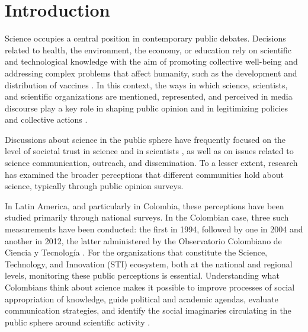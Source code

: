 \documentclass[pdflatex,sn-mathphys-num, iicol]{sn-jnl}
\begin{document}
	
	\maketitle
	
	\section{Introduction}\label{sec:intro}
	
	Science occupies a central position in contemporary public debates. Decisions related to health, the environment, the economy, or education rely on scientific and technological knowledge with the aim of promoting collective well-being and addressing complex problems that affect humanity, such as the development and distribution of vaccines \cite{Chakravartty2022}. In this context, the ways in which science, scientists, and scientific organizations are mentioned, represented, and perceived in media discourse play a key role in shaping public opinion and in legitimizing policies and collective actions \cite{Mede2022}.
	
	Discussions about science in the public sphere have frequently focused on the level of societal trust in science and in scientists \cite{Cologna2025, Sturgis2021, Mede2022}, as well as on issues related to science communication, outreach, and dissemination. To a lesser extent, research has examined the broader perceptions that different communities hold about science, typically through public opinion surveys.
	
	In Latin America, and particularly in Colombia, these perceptions have been studied primarily through national surveys. In the Colombian case, three such measurements have been conducted: the first in 1994, followed by one in 2004 and another in 2012, the latter administered by the Observatorio Colombiano de Ciencia y Tecnolog{\'i}a \cite{Daza_Caicedo2014}. For the organizations that constitute the Science, Technology, and Innovation (STI) ecosystem, both at the national and regional levels, monitoring these public perceptions is essential. Understanding what Colombians think about science makes it possible to improve processes of social appropriation of knowledge, guide political and academic agendas, evaluate communication strategies, and identify the social imaginaries circulating in the public sphere around scientific activity \cite{Daza_Caicedo2014}.
	
\end{document}
